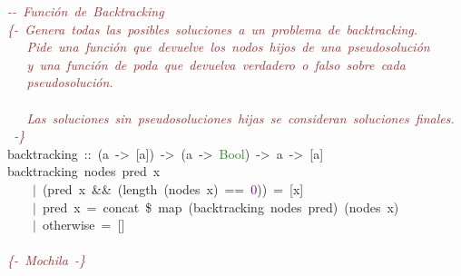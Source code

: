 \noindent
\mbox{}\textit{\textcolor{Brown}{-\/-\ Función\ de\ Backtracking}} \\
\mbox{}\textit{\textcolor{Brown}{\{-\ Genera\ todas\ las\ posibles\ soluciones\ a\ un\ problema\ de\ backtracking.}} \\
\mbox{}\textit{\textcolor{Brown}{\ \ \ Pide\ una\ función\ que\ devuelve\ los\ nodos\ hijos\ de\ una\ pseudosolución}} \\
\mbox{}\textit{\textcolor{Brown}{\ \ \ y\ una\ función\ de\ poda\ que\ devuelva\ verdadero\ o\ falso\ sobre\ cada}} \\
\mbox{}\textit{\textcolor{Brown}{\ \ \ pseudosolución.}} \\
\mbox{} \\
\mbox{}\textit{\textcolor{Brown}{\ \ \ Las\ soluciones\ sin\ pseudosoluciones\ hijas\ se\ consideran\ soluciones\ finales.}} \\
\mbox{}\textit{\textcolor{Brown}{\ -\}}} \\
\mbox{}backtracking\ \textcolor{BrickRed}{::}\ \textcolor{BrickRed}{(}a\ \textcolor{BrickRed}{-\textgreater{}}\ \textcolor{BrickRed}{[}a\textcolor{BrickRed}{])}\ \textcolor{BrickRed}{-\textgreater{}}\ \textcolor{BrickRed}{(}a\ \textcolor{BrickRed}{-\textgreater{}}\ \textcolor{ForestGreen}{Bool}\textcolor{BrickRed}{)}\ \textcolor{BrickRed}{-\textgreater{}}\ a\ \textcolor{BrickRed}{-\textgreater{}}\ \textcolor{BrickRed}{[}a\textcolor{BrickRed}{]} \\
\mbox{}backtracking\ nodes\ pred\ x \\
\mbox{}\ \ \ \ \textcolor{BrickRed}{$|$}\ \textcolor{BrickRed}{(}pred\ x\ \textcolor{BrickRed}{\&\&}\ \textcolor{BrickRed}{(}length\ \textcolor{BrickRed}{(}nodes\ x\textcolor{BrickRed}{)}\ \textcolor{BrickRed}{==}\ \textcolor{Purple}{0}\textcolor{BrickRed}{))}\ \textcolor{BrickRed}{=}\ \textcolor{BrickRed}{[}x\textcolor{BrickRed}{]} \\
\mbox{}\ \ \ \ \textcolor{BrickRed}{$|$}\ pred\ x\ \textcolor{BrickRed}{=}\ concat\ \textcolor{BrickRed}{\$}\ map\ \textcolor{BrickRed}{(}backtracking\ nodes\ pred\textcolor{BrickRed}{)}\ \textcolor{BrickRed}{(}nodes\ x\textcolor{BrickRed}{)} \\
\mbox{}\ \ \ \ \textcolor{BrickRed}{$|$}\ otherwise\ \textcolor{BrickRed}{=}\ \textcolor{BrickRed}{[]} \\
\mbox{}\ \ \ \  \\
\mbox{}\textit{\textcolor{Brown}{\{-\ Mochila\ -\}}} \\
